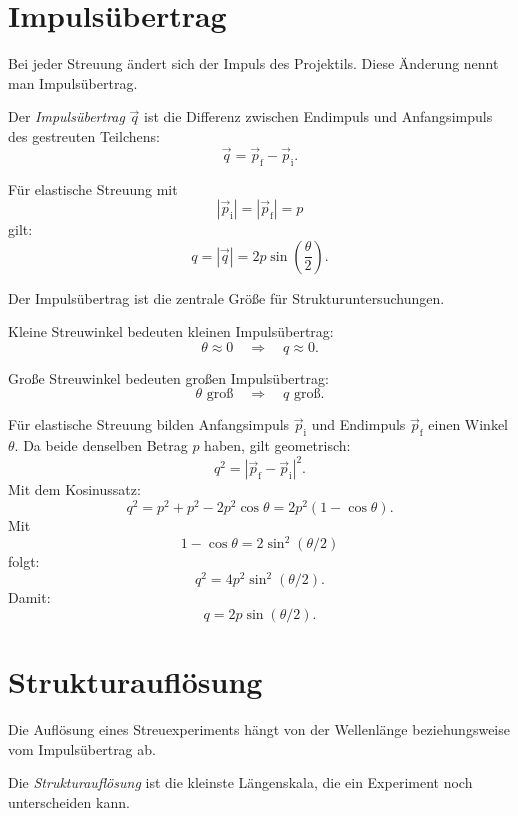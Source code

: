 \section{Impulsübertrag}

Bei jeder Streuung ändert sich der Impuls des Projektils.
Diese Änderung nennt man Impulsübertrag.

\begin{definitionbox}
Der \emph{Impulsübertrag} $\vec q$ ist die Differenz zwischen Endimpuls und Anfangsimpuls
des gestreuten Teilchens:
\[
    \vec q = \vec p_{\mathrm{f}}-\vec p_{\mathrm{i}}.
\]
\end{definitionbox}

\begin{formulabox}
Für elastische Streuung mit
\[
    |\vec p_{\mathrm{i}}|=|\vec p_{\mathrm{f}}|=p
\]
gilt:
\[
    q = |\vec q|
      =
    2p\sin\left(\frac{\theta}{2}\right).
\]
\end{formulabox}

\begin{conceptbox}
Der Impulsübertrag ist die zentrale Größe für Strukturuntersuchungen.

Kleine Streuwinkel bedeuten kleinen Impulsübertrag:
\[
    \theta \approx 0
    \quad\Rightarrow\quad
    q\approx 0.
\]

Große Streuwinkel bedeuten großen Impulsübertrag:
\[
    \theta \text{ groß}
    \quad\Rightarrow\quad
    q \text{ groß}.
\]
\end{conceptbox}

\begin{derivationbox}
Für elastische Streuung bilden Anfangsimpuls $\vec p_{\mathrm{i}}$ und Endimpuls
$\vec p_{\mathrm{f}}$ einen Winkel $\theta$.
Da beide denselben Betrag $p$ haben, gilt geometrisch:
\[
    q^2
    =
    |\vec p_{\mathrm{f}}-\vec p_{\mathrm{i}}|^2.
\]
Mit dem Kosinussatz:
\[
    q^2
    =
    p^2+p^2-2p^2\cos\theta
    =
    2p^2(1-\cos\theta).
\]
Mit
\[
    1-\cos\theta = 2\sin^2(\theta/2)
\]
folgt:
\[
    q^2 = 4p^2\sin^2(\theta/2).
\]
Damit:
\[
    q=2p\sin(\theta/2).
\]
\end{derivationbox}

\section{Strukturauflösung}

Die Auflösung eines Streuexperiments hängt von der Wellenlänge beziehungsweise vom
Impulsübertrag ab.

\begin{definitionbox}
Die \emph{Strukturauflösung} ist die kleinste Längenskala, die ein Experiment noch
unterscheiden kann.
\end{definitionbox}

